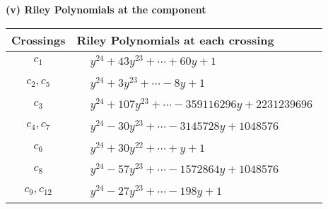\documentclass[1p]{elsarticle_modified}
\theoremstyle{definition}
\begin{document}
\newpage\renewcommand{\arraystretch}{1}
\flushleft \textbf{(v) Riley Polynomials at the component}\newline \\
\begin{tabular}{m{50pt}|m{274pt}}
Crossings & \hspace{64pt}Riley Polynomials at each crossing \\
\hline $$\begin{aligned}c_{1}\end{aligned}$$&$\begin{aligned}
&y^{24}+43 y^{23}+\cdots+60 y+1
\end{aligned}$\\
\hline $$\begin{aligned}c_{2},c_{5}\end{aligned}$$&$\begin{aligned}
&y^{24}+3 y^{23}+\cdots-8 y+1
\end{aligned}$\\
\hline $$\begin{aligned}c_{3}\end{aligned}$$&$\begin{aligned}
&y^{24}+107 y^{23}+\cdots-359116296 y+2231239696
\end{aligned}$\\
\hline $$\begin{aligned}c_{4},c_{7}\end{aligned}$$&$\begin{aligned}
&y^{24}-30 y^{23}+\cdots-3145728 y+1048576
\end{aligned}$\\
\hline $$\begin{aligned}c_{6}\end{aligned}$$&$\begin{aligned}
&y^{24}+30 y^{22}+\cdots+y+1
\end{aligned}$\\
\hline $$\begin{aligned}c_{8}\end{aligned}$$&$\begin{aligned}
&y^{24}-57 y^{23}+\cdots-1572864 y+1048576
\end{aligned}$\\
\hline $$\begin{aligned}c_{9},c_{12}\end{aligned}$$&$\begin{aligned}
&y^{24}-27 y^{23}+\cdots-198 y+1
\end{aligned}$\\

\end{tabular}
\end{document}

